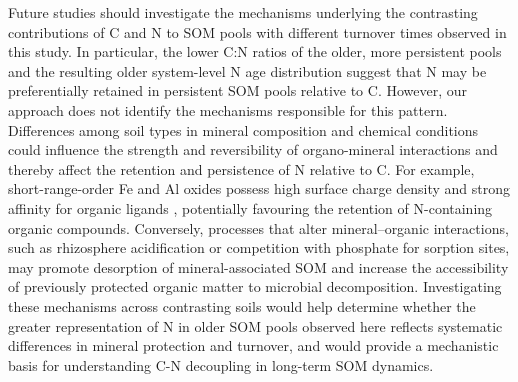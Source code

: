 \documentclass[bg, manuscript]{copernicus}
\begin{document}
Future studies should investigate the mechanisms underlying the contrasting contributions of C and N to SOM pools with different turnover times observed in this study. In particular, the lower C:N ratios of the older, more persistent pools and the resulting older system-level N age distribution suggest that N may be preferentially retained in persistent SOM pools relative to C. However, our approach does not identify the mechanisms responsible for this pattern. Differences among soil types in mineral composition and chemical conditions could influence the strength and reversibility of organo-mineral interactions and thereby affect the retention and persistence of N relative to C. For example, short-range-order Fe and Al oxides possess high surface charge density and strong affinity for organic ligands \citep{Wang2013}, potentially favouring the retention of N-containing organic compounds. Conversely, processes that alter mineral–organic interactions, such as rhizosphere acidification or competition with phosphate for sorption sites, may promote desorption of mineral-associated SOM \citep{Keiluweit2015, Spohn2022} and increase the accessibility of previously protected organic matter to microbial decomposition. Investigating these mechanisms across contrasting soils would help determine whether the greater representation of N in older SOM pools observed here reflects systematic differences in mineral protection and turnover, and would provide a mechanistic basis for understanding C-N decoupling in long-term SOM dynamics.
\end{document}
